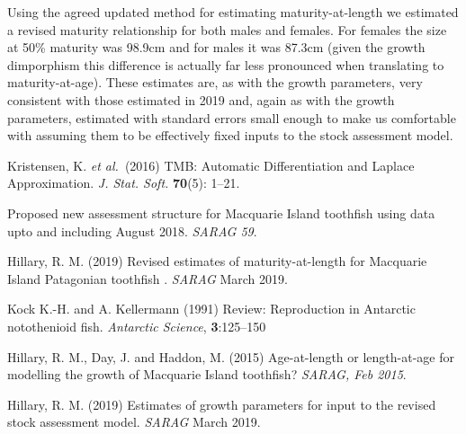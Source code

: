 \documentclass[12pt,a4paper,twoside,times,blue,standard]{csiroreport2017}
\newcommand{\etal}{\textit{et al.}}
\begin{document}
Using the agreed updated method for estimating maturity-at-length \cite{mimat} we estimated a revised maturity relationship for both males and females. For females the size at 50\% maturity was 98.9cm and for males it was 87.3cm (given the growth dimporphism this difference is actually far less pronounced when translating to maturity-at-age). These estimates are, as with the growth parameters, very consistent with those estimated in 2019 \cite{mimat} and, again as with the growth parameters, estimated with standard errors small enough to make us comfortable with assuming them to be effectively fixed inputs to the stock assessment model.

\clearpage
\begin{thebibliography}{99}

         Kristensen, K. \etal~(2016) TMB: Automatic Differentiation and Laplace Approximation. \textit{J. Stat. Soft.} {\bf 70}(5): 1--21.
         
 Proposed new assessment structure for Macquarie Island toothfish using data upto and including August 2018. \textit{SARAG 59}.

     Hillary, R. M. (2019) Revised estimates of maturity-at-length for Macquarie Island Patagonian toothfish . \textit{SARAG} March 2019.

     Kock K.-H. and A. Kellermann (1991) Review: Reproduction in Antarctic notothenioid fish. \textit{Antarctic Science}, \textbf{3}:125--150 

     Hillary, R. M., Day, J. and Haddon, M. (2015) Age-at-length or length-at-age for modelling the growth of Macquarie Island toothfish? \textit{SARAG, Feb 2015}.


     Hillary, R. M. (2019) Estimates of growth parameters for input to the revised stock assessment model. \textit{SARAG} March 2019.

    \end{thebibliography}
\end{document}
